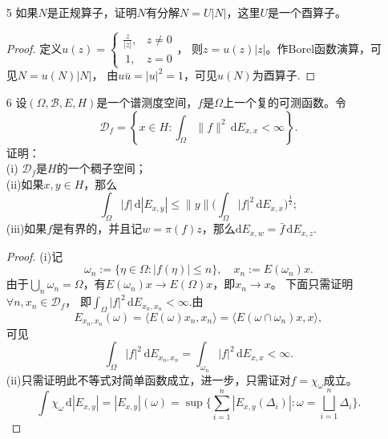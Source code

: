 \begin{enumerate}
\begin{proof}
(i) 对$x\in(\Ran P)^\perp$，有$\langle Px,x\rangle  = 0$，
从而$t\langle A_1x,x\rangle +(1-t)\langle A_2x,x\rangle =0$。
由于$\langle A_ix,x\rangle=\|A_i^{\frac{1}{2}}x\|^2\geqslant0$，可见$A_ix=0,i=1,2$.

(ii) 对$x\in \Ran P$，有$(I-P)x=0$，类似上述情形可以证明$A_i=I,I=1,2$.

反之，对于这一集合的端点$A$，要证$A$为投影，只需证$A^2=A$。
注意到$A=\frac{2A-A^2}2+\frac{A^2}2$，
由$2x-x^2\leqslant 1,x\in \mathbb{R}$，可见$2A-A^2\leqslant I$。
由于$A$为端点，从而$2A-A^2=A^2$，即证.
\end{proof}

\item[5]
如果$N$是正规算子，证明$N$有分解$N=U|N|$，这里$U$是一个酉算子。
\begin{proof}
    定义$u(z)=\begin{cases}\frac{z}{|z|},&z\neq 0\\
    \ 1,&z=0\end{cases}$，
则$z=u(z)|z|$。作Borel函数演算，可见$N=u(N)|N|$，
由$u\bar{u}=|u|^2=1$，可见$u(N)$为酉算子.
\end{proof}

\item[6]
设$(\varOmega,\mathcal{B},E,H)$是一个谱测度空间，$f$是$\varOmega$上一个复的可测函数。令
\[\mathcal{D}_f=\left\{ x\in H:\int_\varOmega \|f\|^2\,\mathrm{d}E_{x,x}< \infty \right\}.\]
证明：\\
(i) $\mathcal{D}_f$是$H$的一个稠子空间；\\
(ii)如果$x,y\in H$，那么\[\int_{\varOmega} |f|\,\mathrm{d}|E_{x,y}|
\leqslant \|y\| \Big(\int_{\varOmega} |f|^2\,\mathrm{d} E_{x,x}\Big)^{\frac{1}{2}};\]
(iii)如果$f$是有界的，并且记$w=\pi(f)z$，那么$\mathrm{d}E_{x,w}=\bar{f}\,\mathrm{d}E_{x,z}$.\\
\begin{proof}
(i)记\[\omega_n:= \{\eta\in\varOmega:|f(\eta)| \leqslant n\}, \quad x_n:=E(\omega_n)x.\]
由于$\bigcup_{n} \omega_n=\varOmega$，有$E(\omega_n)x\to E(\varOmega)x$，即$x_n\rightarrow x$。
下面只需证明$\forall n,x_n\in \mathcal{D}_f$，
即$\int_\varOmega |f|^2\,\mathrm{d}E_{x_n,x_n}< \infty $.由
\[E_{x_n,x_n}(\omega)= \langle E(\omega)x_n,x_n\rangle  = \langle E(\omega\cap \omega_n)x,x\rangle,\]
可见\[\int_\varOmega |f|^2\,\mathrm{d}E_{x_n,x_n} =\int_{\omega_n} |f|^2\,\mathrm{d}E_{x,x}< \infty.\]
(ii)只需证明此不等式对简单函数成立，进一步，只需证对$f=\chi_\omega$成立。
$$\int \chi_{\omega}\,\mathrm{d}|E_{x,y}|= |E_{x,y}|(\omega)
=\sup\Big\{ \sum_{i=1}^n |E_{x,y}(\Delta_i)|:\omega=\bigsqcup_{i=1}^n \Delta_i\Big\}.$$


\end{proof}
\end{enumerate}
